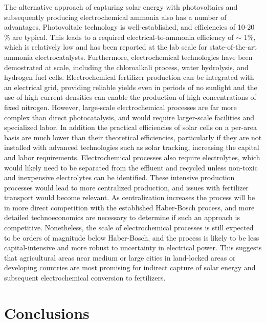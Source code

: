 The alternative approach of capturing solar energy with photovoltaics and subsequently producing electrochemical ammonia also has a number of advantages. Photovoltaic technology is well-established, and efficiencies of 10-20 \% are typical. This leads to a required electrical-to-ammonia efficiency of $\sim$ 1\%, which is relatively low and has been reported at the lab scale for state-of-the-art ammonia electrocatalysts. Furthermore, electrochemical technologies have been demostrated at scale, including the chloroalkali process, water hydrolysis, and hydrogen fuel cells. Electrochemical fertilizer production can be integrated with an electrical grid, providing reliable yields even in periods of no sunlight and the use of high current densities can enable the production of high concentrations of fixed nitrogen. However, large-scale electrochemical processes are far more complex than direct photocatalysis, and would require larger-scale facilities and specialized labor. In addition the practical efficiencies of solar cells on a per-area basis are much lower than their theoretical efficiencies, particularly if they are not installed with advanced technologies such as solar tracking, increasing the capital and labor requirements. Electrochemical processes also require electrolytes, which would likely need to be separated from the effluent and recycled unless non-toxic and inexpensive electrolytes can be identified. These intensive production processes would lead to more centralized production, and issues with fertilizer transport would become relevant. As centralization increases the process will be in more direct competition with the established Haber-Bosch process, and more detailed technoeconomics are necessary to determine if such an approach is competitive. Nonetheless, the scale of electrochemical processes is still expected to be orders of magnitude below Haber-Bosch, and the process is likely to be less capital-intensive and more robust to uncertainty in electrical power. This suggests that agricultural areas near medium or large cities in land-locked areas or developing countries are most promising for indirect capture of solar energy and subsequent electrochemical conversion to fertilizers.

\section{Conclusions}

